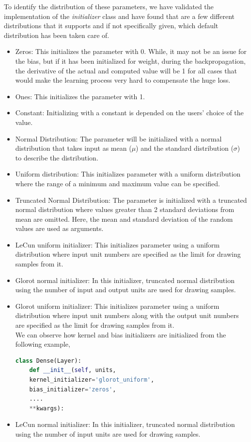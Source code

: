 To identify the distribution of these parameters, we have validated the implementation of the \emph{initializer} class and have found that are a few different distributions that it supports and if not specifically given, which default distribution has been taken care of.
\begin{itemize}
	\item Zeros: This initializes the parameter with 0. While, it may not be an issue for the bias, but if it has been initialized for weight, during the backpropagation, the derivative of the actual and computed value will be 1 for all cases that would make the learning process very hard to compensate the huge loss.
	\item Ones: This initializes the parameter with 1.
	\item Constant: Initializing with a constant is depended on the users' choice of the value.
	\item Normal Distribution: The parameter will be initialized with a normal distribution that takes input as mean ($\mu$) and the standard distribution ($\sigma$) to describe the distribution.
	\item Uniform distribution: This initializes parameter with a uniform distribution where the range of a minimum and maximum value can be specified.
	\item Truncated Normal Distribution: The parameter is initialized with a truncated normal distribution where values greater than 2 standard deviations from mean are omitted. Here, the mean and standard deviation of the random values are used as arguments.
	\item LeCun uniform initializer: This initializes parameter using a uniform distribution where input unit numbers are specified as the limit for drawing samples from it.
	\item Glorot normal initializer: In this initializer, truncated normal distribution using the number of input and output units are used for drawing samples. 
	\item Glorot uniform initializer: This initializes parameter using a uniform distribution where input unit numbers along with the output unit numbers are specified as the limit for drawing samples from it. \\
	We can observe how kernel and bias initializers are initialized from the following example,
	\begin{lstlisting}[language=Python, caption=Example of Keras's default setup]
	class Dense(Layer):
	def __init__(self, units,
	kernel_initializer='glorot_uniform',
	bias_initializer='zeros',
	....
	**kwargs):\end{lstlisting}
	\item LeCun normal initializer: In this initializer, truncated normal distribution using the number of input units are used for drawing samples.
\end{itemize}
